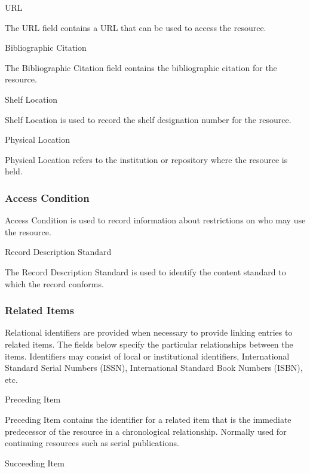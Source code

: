 \documentclass[12pt,a4paper]{scrreprt}
\begin{document}
URL

The URL field contains a URL that can be used to access the resource.

Bibliographic Citation

The Bibliographic Citation field contains the bibliographic citation for the resource.

Shelf Location

Shelf Location is used to record the shelf designation number for the resource.

Physical Location

Physical Location refers to the institution or repository where the resource is held.

\subsubsection{Access Condition}
Access Condition is used to record information about restrictions on who may use the resource.

%

Record Description Standard

The Record Description Standard is used to identify the content standard to which the record conforms.

\subsubsection{Related Items}
Relational identifiers are provided when necessary to provide linking entries to related items. The fields below specify the particular relationships between the items. Identifiers may consist of local or institutional identifiers, International Standard Serial Numbers (ISSN), International Standard Book Numbers (ISBN), etc.

Preceding Item

Preceding Item contains the identifier for a related item that is the immediate predecessor of the resource in a chronological relationship. Normally used for continuing resources such as serial publications.

Succeeding Item
\end{document}
